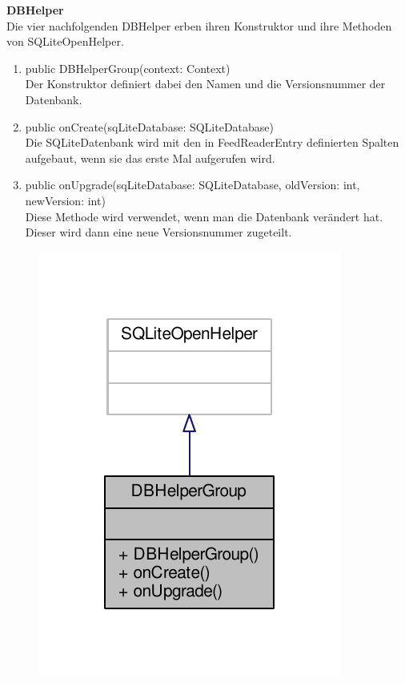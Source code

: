 \textbf{DBHelper}\\
Die vier nachfolgenden DBHelper erben ihren Konstruktor und ihre Methoden von SQLiteOpenHelper. 
\begin{enumerate}
	\item public DBHelperGroup(context: Context)\\
		Der Konstruktor definiert dabei den Namen und die Versionsnummer der Datenbank.
	\item public onCreate(sqLiteDatabase: SQLiteDatabase)\\
		Die SQLiteDatenbank wird mit den in FeedReaderEntry definierten Spalten aufgebaut, wenn sie das erste Mal aufgerufen wird.
	\item public onUpgrade(sqLiteDatabase: SQLiteDatabase, oldVersion: int, newVersion: int)\\
		Diese Methode wird verwendet, wenn man die Datenbank verändert hat. Dieser wird dann eine neue Versionsnummer zugeteilt.	
\end{enumerate}
\begin{figure}[H]
	\includegraphics[scale = 1]{res/umlClasses/d_b_helper_group__coll__graph.pdf}
	\centering	
\end{figure}

